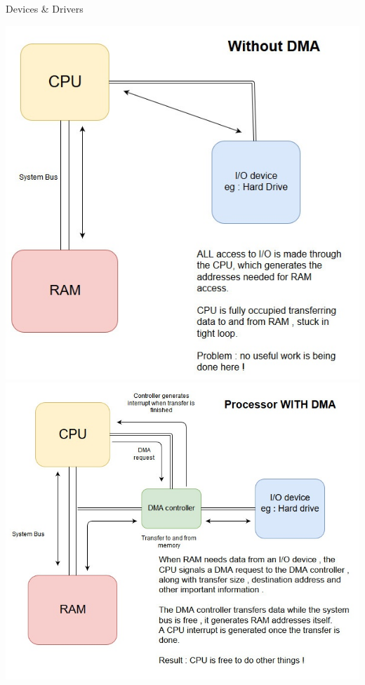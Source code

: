 \documentclass[10pt]{beamer}
\begin{document}
\begin{frame}[allowframebreaks]{Devices \& Drivers}
\begin{center}
      \includegraphics[keepaspectratio, width=\textwidth, height=\textheight-2\baselineskip-2\baselineskip]{img/030_no_dma.jpg} \\ \framebreak
      \includegraphics[keepaspectratio, width=\textwidth, height=\textheight-2\baselineskip-2\baselineskip]{img/030_dma.jpg} \\ \framebreak

\end{center}
\end{frame}
\end{document}
